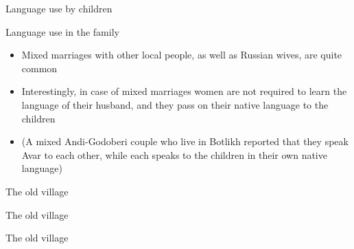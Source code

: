\begin{frame}{Language use by children}
\begin{figure}[h]
\centering
{}
\end{figure}
\end{frame}


\begin{frame}{Language use in the family}
\begin{itemize}
    \item Mixed marriages with other local people, as well as Russian wives, are quite common
    \item Interestingly, in case of mixed marriages women are not required to learn the language of their husband, and they pass on their native language to the children
    \item (A mixed Andi-Godoberi couple who live in Botlikh reported that they speak Avar to each other, while each speaks to the children in their own native language)
\end{itemize}
\end{frame}


\begin{frame}{The old village}
\begin{figure}[h]
\centering
{}
\end{figure}
\end{frame}

\begin{frame}{The old village}
\begin{figure}[h]
\centering
{}
\end{figure}
\end{frame}

\begin{frame}{The old village}
\begin{figure}[h]
\centering
{}
\end{figure}
\end{frame}

